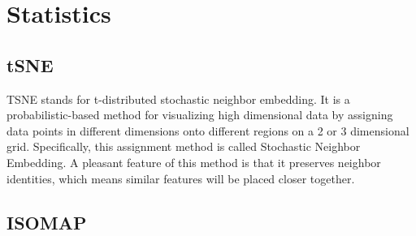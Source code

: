 \chapter{Statistics}
\label{app:stat}

\section{tSNE}
\label{app:stat:tsne}
TSNE stands for t-distributed stochastic neighbor embedding. It is a probabilistic-based method for visualizing high dimensional data by assigning data points in different dimensions onto different regions on a 2 or 3 dimensional grid. Specifically, this assignment method is called Stochastic Neighbor Embedding\cite{hintonStochasticNeighborEmbedding2002}. A pleasant feature of this method is that it preserves neighbor identities, which means similar features will be placed closer together.

\section{ISOMAP}
\label{app:stat:isomap}





